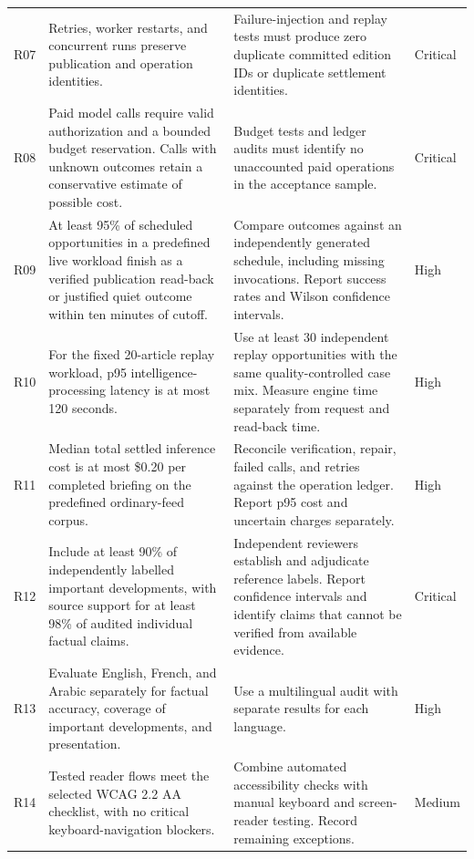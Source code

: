 \begin{longtable}{
    p{}
    p{}
    p{}
    p{}
}
R07
& Retries, worker restarts, and concurrent runs preserve publication and operation identities.
& Failure-injection and replay tests must produce zero duplicate committed edition IDs or duplicate settlement identities.
& Critical \\

R08
& Paid model calls require valid authorization and a bounded budget reservation. Calls with unknown outcomes retain a conservative estimate of possible cost.
& Budget tests and ledger audits must identify no unaccounted paid operations in the acceptance sample.
& Critical \\

R09
& At least 95\% of scheduled opportunities in a predefined live workload finish as a verified publication read-back or justified quiet outcome within ten minutes of cutoff.
& Compare outcomes against an independently generated schedule, including missing invocations. Report success rates and Wilson confidence intervals.
& High \\

R10
& For the fixed 20-article replay workload, p95 intelligence-processing latency is at most 120 seconds.
& Use at least 30 independent replay opportunities with the same quality-controlled case mix. Measure engine time separately from request and read-back time.
& High \\

R11
& Median total settled inference cost is at most \$0.20 per completed briefing on the predefined ordinary-feed corpus.
& Reconcile verification, repair, failed calls, and retries against the operation ledger. Report p95 cost and uncertain charges separately.
& High \\

R12
& Include at least 90\% of independently labelled important developments, with source support for at least 98\% of audited individual factual claims.
& Independent reviewers establish and adjudicate reference labels. Report confidence intervals and identify claims that cannot be verified from available evidence.
& Critical \\

R13
& Evaluate English, French, and Arabic separately for factual accuracy, coverage of important developments, and presentation.
& Use a multilingual audit with separate results for each language.
& High \\

R14
& Tested reader flows meet the selected WCAG 2.2 AA checklist, with no critical keyboard-navigation blockers.
& Combine automated accessibility checks with manual keyboard and screen-reader testing. Record remaining exceptions.
& Medium \\


\end{longtable}
